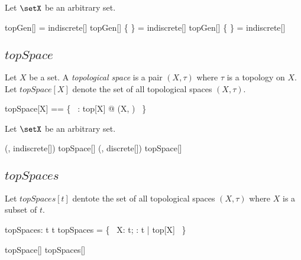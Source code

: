 \documentclass{amsart}
\begin{document}
\begin{example}
Let $\setX$ be an arbitrary set.

\begin{zed}
	topGen[\setX] \emptyset = indiscrete[\setX]
\also
	topGen[\setX] \{ \emptyset \} = indiscrete[\setX]
\also
	topGen[\setX] \{ \setX \} = indiscrete[\setX]
\end{zed}

\end{example}

\subsection{$topSpace$}

Let $X$ be a set.
A {\it topological space} is a pair $(X, \tau)$ where $\tau$ is a topology on $X$.
Let $topSpace[X]$ denote the set of all topological spaces $(X,\tau)$.

\begin{zed}
	topSpace[X] == \{~ \tau: top[X] @ (X, \tau) ~\}
\end{zed}

\begin{example}
Let $\setX$ be an arbitrary set.

\begin{zed}
	(\setX, indiscrete[\setX]) \in topSpace[\setX]
\also
	(\setX, discrete[\setX]) \in topSpace[\setX]
\end{zed}


\end{example}

\subsection{$topSpaces$}

Let $topSpaces[t]$ dentote the set of all topological spaces $(X,\tau)$ where $X$ is a subset of $t$.

\begin{gendef}[t]
	topSpaces: \power t \rel \Fam t
\where
	topSpaces = \{~ X: \power t; \tau: \Fam t | \tau \in top[X] ~\}
\end{gendef}

\begin{remark}

\begin{zed}
	topSpace[\setX] \subseteq topSpaces[\setX]
\end{zed}

\end{remark}
\end{document}
